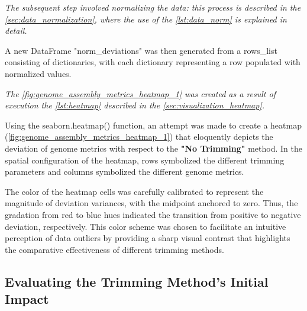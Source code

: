 \textit{The subsequent step involved normalizing the data: this process is described in the \autoref{sec:data_normalization}, where the use of the \autoref{lst:data_norm} is explained in detail.}


A new DataFrame "norm\_deviations" was then generated from a rows\_list consisting of dictionaries, with each dictionary representing a row populated with normalized values.

\textit{The \autoref{fig:genome_assembly_metrics_heatmap_1} was created as a result of execution  the \autoref{lst:heatmap} described in the \autoref{sec:visualization_heatmap}.}



Using the seaborn.heatmap() function, an attempt was made to create a \gls{heatmap} (\autoref{fig:genome_assembly_metrics_heatmap_1}) that eloquently depicts the \gls{deviation} of \gls{genome} \gls{metrics} with respect to the \textbf{"No Trimming"} method. In the spatial configuration of the \gls{heatmap}, rows symbolized the different \gls{trimming} parameters and columns symbolized the different \gls{genome} \gls{metrics}.

The color of the \gls{heatmap} cells was carefully calibrated to represent the magnitude of \gls{deviation} variances, with the midpoint anchored to zero. Thus, the gradation from red to blue hues indicated the transition from positive to negative \gls{deviation}, respectively. This color scheme was chosen to facilitate an intuitive perception of data outliers by providing a sharp visual contrast that highlights the comparative effectiveness of different \gls{trimming} methods.





\subsection{Evaluating the Trimming Method's Initial Impact} 


